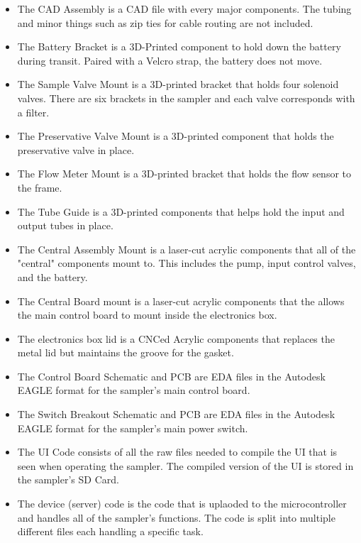 \documentclass[11pt, letterpaper]{article}
\begin{document}
\vskip 0.3cm
\noindent
\begin{itemize}
\item 
The CAD Assembly is a CAD file with every major components. The tubing and minor things such as zip ties for cable routing are not included. 
\item 
The Battery Bracket is a 3D-Printed component to hold down the battery during transit. Paired with a Velcro strap, the battery does not move.
\item 
The Sample Valve Mount is a 3D-printed bracket that holds four solenoid valves. There are six brackets in the sampler and each valve corresponds with a filter. 
\item 
The Preservative Valve Mount is a 3D-printed component that holds the preservative valve in place. 
\item 
The Flow Meter Mount is a 3D-printed bracket that holds the flow sensor to the frame.
\item 
The Tube Guide is a 3D-printed components that helps hold the input and output tubes in place. 
\item 
The Central Assembly Mount is a laser-cut acrylic components that all of the "central" components mount to. This includes the pump, input control valves, and the battery. 
\item 
The Central Board mount is a laser-cut acrylic components that the allows the main control board to mount inside the electronics box.
\item 
The electronics box lid is a CNCed Acrylic components that replaces the metal lid but maintains the groove for the gasket.
\item 
The Control Board Schematic and PCB are EDA files in the Autodesk EAGLE format for the sampler's main control board. 
\item 
The Switch Breakout Schematic and PCB are EDA files in the Autodesk EAGLE format for the sampler's main power switch. 
\item 
The UI Code consists of all the raw files needed to compile the UI that is seen when operating the sampler. The compiled version of the UI is stored in the sampler's SD Card.
\item 
The device (server) code is the code that is uplaoded to the microcontroller and handles all of the sampler's functions. The code is split into multiple different files each handling a specific task. 
\end{itemize}
\end{document}
